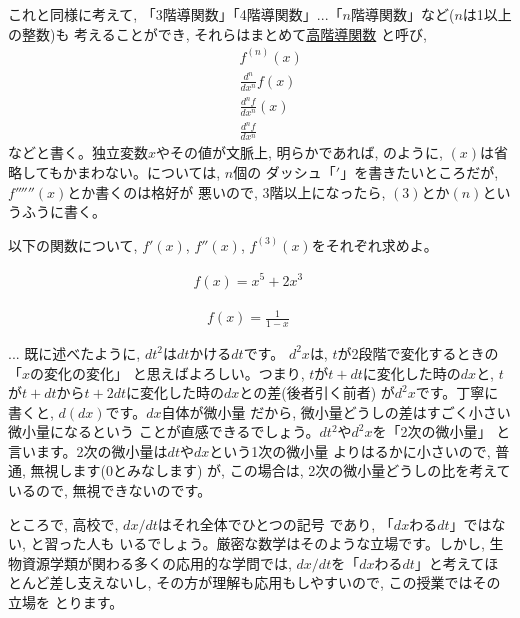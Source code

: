 これと同様に考えて, 「3階導関数」「4階導関数」...「$n$階導関数」など($n$は1以上の整数)も
考えることができ, それらはまとめて\underline{高階導関数} と呼び, 
\begin{eqnarray}
&&f^{(n)}(x)\label{eq:diff_mult_def1}\\
&&\frac{d^n}{dx^n}f(x)\label{eq:diff_mult_def2}\\
&&\frac{d^nf}{dx^n}(x)\label{eq:diff_mult_def3}\\
&&\frac{d^nf}{dx^n}\label{eq:diff_mult_def4}
\end{eqnarray}
などと書く。独立変数$x$やその値が文脈上, 明らかであれば, のように, 
$(x)$は省略してもかまわない。については, $n$個の
ダッシュ「$'$」を書きたいところだが, $f''''''(x)$とか書くのは格好が
悪いので, 3階以上になったら, $(3)$とか$(n)$というふうに書く。\hv

\begin{q}\label{q:diff_func9} 以下の関数について, $f'(x)$, $f''(x)$, $f^{(3)}(x)$をそれぞれ求めよ。
\begin{edaenumerate}
\item \begin{eqnarray*}f(x)=x^5+2x^3\,\,\,\,\,\,\,\,\,\,\end{eqnarray*}
\item \begin{eqnarray*}f(x)=\frac{1}{1-x}\,\,\,\,\,\,\,\,\,\,\end{eqnarray*}
\end{edaenumerate}\end{q} 
\mv

\begin{faq}{\small{} ... 
既に述べたように, $dt^2$は$dt$かける$dt$です。
$d^2x$は, $t$が2段階で変化するときの「$x$の変化の変化」
と思えばよろしい。つまり, $t$が$t+dt$に変化した時の$dx$と, 
$t$が$t+dt$から$t+2dt$に変化した時の$dx$との差(後者引く前者)
が$d^2x$です。丁寧に書くと, $d(dx)$です。$dx$自体が微小量
だから, 微小量どうしの差はすごく小さい微小量になるという
ことが直感できるでしょう。$dt^2$や$d^2x$を「2次の微小量」
と言います。2次の微小量は$dt$や$dx$という1次の微小量
よりはるかに小さいので, 普通, 無視します(0とみなします)
が, この場合は, 2次の微小量どうしの比を考えているので, 
無視できないのです。

ところで, 高校で, $dx/dt$はそれ全体でひとつの記号
であり, 「$dx$わる$dt$」ではない, と習った人も
いるでしょう。厳密な数学はそのような立場です。しかし, 
生物資源学類が関わる多くの応用的な学問では, 
$dx/dt$を「$dx$わる$dt$」と考えてほとんど差し支えないし, 
その方が理解も応用もしやすいので, この授業ではその立場を
とります。}\end{faq}



